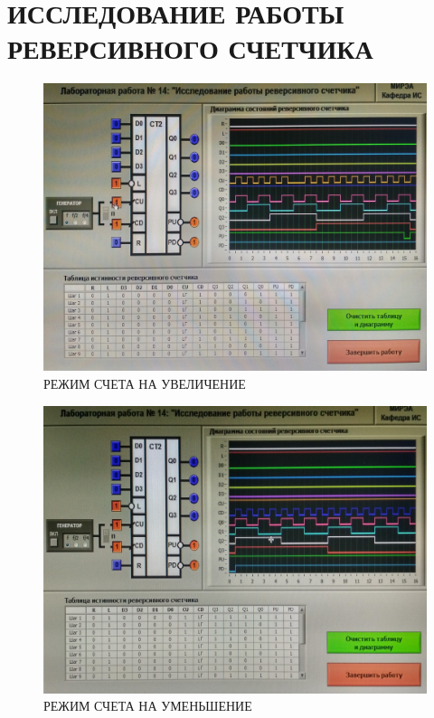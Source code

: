 \section{ИССЛЕДОВАНИЕ РАБОТЫ РЕВЕРСИВНОГО СЧЕТЧИКА}


\begin{figure}[H]
	\centering
	\includegraphics[width=0.95\linewidth]{imgs/14/1.jpg}
	\caption{РЕЖИМ СЧЕТА НА УВЕЛИЧЕНИЕ}
	\label{fig:14_1}
\end{figure}

\begin{figure}[H]
	\centering
	\includegraphics[width=0.95\linewidth]{imgs/14/2.jpg}
	\caption{РЕЖИМ СЧЕТА НА УМЕНЬШЕНИЕ}
	\label{fig:14_2}
\end{figure}

